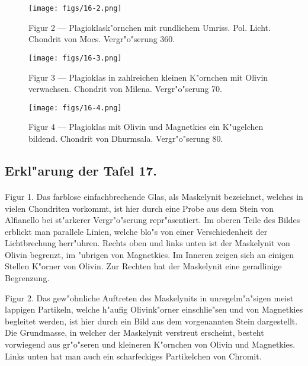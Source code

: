 \documentclass[a4paper, 11pt, oneside, polutonikogreek, german]{article}
\begin{document}
\vspace*{\fill}
\begin{figure}[H]
\centering
\texttt{[image: figs/16-2.png]}
\caption{\small Figur 2 --- Plagioklask"ornchen mit rundlichem Umriss. Pol. Licht. Chondrit von Mocs. Vergr"o"serung 360.}
\end{figure}
\vspace*{\fill}
\clearpage

\vspace*{\fill}
\begin{figure}[H]
\centering
\texttt{[image: figs/16-3.png]}
\caption{\small Figur 3 --- Plagioklas in zahlreichen kleinen K"ornchen mit Olivin verwachsen. Chondrit von Milena. Vergr"o"serung 70.}
\end{figure}
\vspace*{\fill}
\clearpage

\vspace*{\fill}
\begin{figure}[H]
\centering
\texttt{[image: figs/16-4.png]}
\caption{\small Figur 4 --- Plagioklas mit Olivin und Magnetkies ein K"ugelchen bildend. Chondrit von Dhurmsala. Vergr"o"serung 80.}
\end{figure}
\vspace*{\fill} 
\clearpage

\subsection{Erkl"arung der Tafel 17.}
\paragraph{}
Figur 1. Das farblose einfachbrechende Glas, als Maskelynit bezeichnet, welches in vielen Chondriten vorkommt, ist hier durch eine Probe aus dem Stein von Alfianello bei st"arkerer Vergr"o"serung repr"asentiert. Im oberen Teile des Bildes erblickt man parallele Linien, welche blo"s von einer Verschiedenheit der Lichtbrechung herr"uhren. Rechts oben und links unten ist der Maskelynit von Olivin begrenzt, im "ubrigen von Magnetkies. Im Inneren zeigen sich an einigen Stellen K"orner von Olivin. Zur Rechten hat der Maskelynit eine geradlinige Begrenzung.

Figur 2. Das gew"ohnliche Auftreten des Maskelynits in unregelm"a"sigen meist lappigen Partikeln, welche h"aufig Olivink"orner einschlie"sen und von Magnetkies begleitet werden, ist hier durch ein Bild aus dem vorgenannten Stein dargestellt. Die Grundmasse, in welcher der Maskelynit verstreut erscheint, besteht vorwiegend aus gr"o"seren und kleineren K"ornchen von Olivin und Magnetkies. Links unten hat man auch ein scharfeckiges Partikelchen von Chromit.
\end{document}
